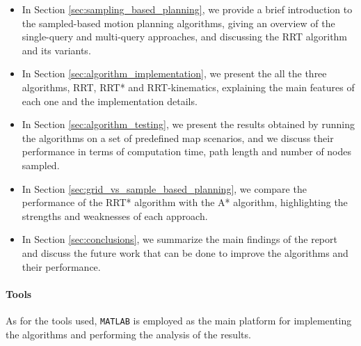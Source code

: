 \begin{itemize}
    \item In Section \ref{sec:sampling_based_planning}, we provide a brief introduction to the sampled-based motion planning algorithms, giving an overview of the single-query and multi-query approaches, and discussing the RRT algorithm and its variants.
    \item In Section \ref{sec:algorithm_implementation}, we present the all the three algorithms, RRT, RRT* and RRT-kinematics, explaining the main features of each one and the implementation details.
    \item In Section \ref{sec:algorithm_testing}, we present the results obtained by running the algorithms on a set of predefined map scenarios, and we discuss their performance in terms of computation time, path length and number of nodes sampled.
    \item In Section \ref{sec:grid_vs_sample_based_planning}, we compare the performance of the RRT* algorithm with the A* algorithm, highlighting the strengths and weaknesses of each approach.
    \item In Section \ref{sec:conclusions}, we summarize the main findings of the report and discuss the future work that can be done to improve the algorithms and their performance.
\end{itemize}


\paragraph{Tools}

As for the tools used, \texttt{MATLAB} is employed as the main platform for implementing the algorithms and performing the analysis of the results.
